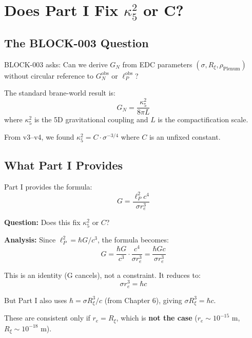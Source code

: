 \documentclass[11pt,a4paper]{article}
\begin{document}
\section{Does Part I Fix $\kappa_5^2$ or C?}
\label{sec:kappa-analysis}

\subsection{The BLOCK-003 Question}

BLOCK-003 asks: Can we derive $G_N$ from EDC parameters $(\sigma, R_\xi, \rho_{\text{Plenum}})$ without circular reference to $G_N^{\text{obs}}$ or $\ell_P^{\text{obs}}$?

The standard brane-world result is:
\begin{equation}
G_N = \frac{\kappa_5^2}{8\pi L}
\end{equation}
where $\kappa_5^2$ is the 5D gravitational coupling and $L$ is the compactification scale.

From v3--v4, we found $\kappa_5^2 = C \cdot \sigma^{-3/4}$ where $C$ is an unfixed constant.

\subsection{What Part I Provides}

Part I provides the formula:
\begin{equation}
G = \frac{\ell_P^2 c^4}{\sigma r_e^3}
\end{equation}

\textbf{Question:} Does this fix $\kappa_5^2$ or $C$?

\textbf{Analysis:} Since $\ell_P^2 = \hbar G/c^3$, the formula becomes:
\begin{equation}
G = \frac{\hbar G}{c^3} \cdot \frac{c^4}{\sigma r_e^3} = \frac{\hbar G c}{\sigma r_e^3}
\end{equation}

This is an identity (G cancels), not a constraint. It reduces to:
\begin{equation}
\sigma r_e^3 = \hbar c
\end{equation}

But Part I also uses $\hbar = \sigma R_\xi^3/c$ (from Chapter 6), giving $\sigma R_\xi^3 = \hbar c$.

These are consistent only if $r_e = R_\xi$, which is \textbf{not the case} ($r_e \sim 10^{-15}$ m, $R_\xi \sim 10^{-18}$ m).
\end{document}
